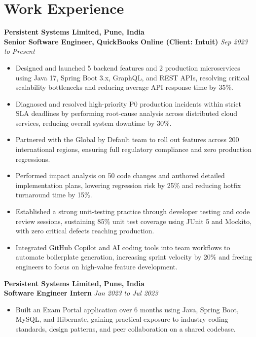 \documentclass[10pt, letterpaper]{article}
\begin{document}
\section{Work Experience}

\textbf{Persistent Systems Limited, Pune, India} \\
\textbf{Senior Software Engineer, QuickBooks Online (Client: Intuit)} \hfill \textit{Sep 2023 to Present}
\begin{itemize}[leftmargin=0.2in, itemsep=1pt, parsep=0pt, topsep=2pt]
    \item Designed and launched 5 backend features and 2 production microservices using Java 17, Spring Boot 3.x, GraphQL, and REST APIs, resolving critical scalability bottlenecks and reducing average API response time by 35\%.
    \item Diagnosed and resolved high-priority P0 production incidents within strict SLA deadlines by performing root-cause analysis across distributed cloud services, reducing overall system downtime by 30\%.
    \item Partnered with the Global by Default team to roll out features across 200 international regions, ensuring full regulatory compliance and zero production regressions.
    \item Performed impact analysis on 50 code changes and authored detailed implementation plans, lowering regression risk by 25\% and reducing hotfix turnaround time by 15\%.
    \item Established a strong unit-testing practice through developer testing and code review sessions, sustaining 85\% unit test coverage using JUnit 5 and Mockito, with zero critical defects reaching production.
    \item Integrated GitHub Copilot and AI coding tools into team workflows to automate boilerplate generation, increasing sprint velocity by 20\% and freeing engineers to focus on high-value feature development.
\end{itemize}

\textbf{Persistent Systems Limited, Pune, India} \\
\textbf{Software Engineer Intern} \hfill \textit{Jan 2023 to Jul 2023}
\begin{itemize}[leftmargin=0.2in, itemsep=1pt, parsep=0pt, topsep=2pt]
    \item Built an Exam Portal application over 6 months using Java, Spring Boot, MySQL, and Hibernate, gaining practical exposure to industry coding standards, design patterns, and peer collaboration on a shared codebase.
\end{itemize}
\end{document}
